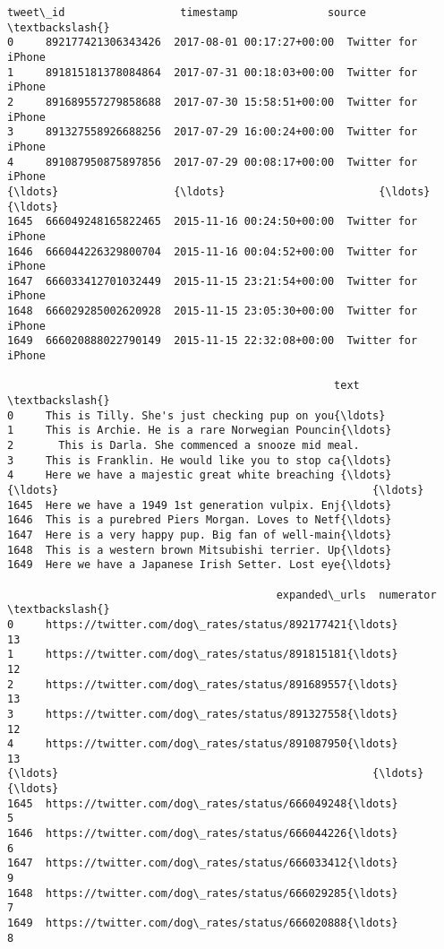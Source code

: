 \documentclass[11pt]{article}
\makeatletter
\newcommand{\boxspacing}{\kern\kvtcb@left@rule\kern\kvtcb@boxsep}
\newcommand{\prompt}[4]{
        {\ttfamily\llap{{\color{#2}[#3]:\hspace{3pt}#4}}\vspace{-\baselineskip}}
    }
\makeatother
\begin{document}
            \begin{tcolorbox}[breakable, size=fbox, boxrule=.5pt, pad at break*=1mm, opacityfill=0]
\prompt{Out}{outcolor}{76}{\boxspacing}
\begin{Verbatim}[commandchars=\\\{\}]
                tweet\_id                  timestamp              source  \textbackslash{}
0     892177421306343426  2017-08-01 00:17:27+00:00  Twitter for iPhone
1     891815181378084864  2017-07-31 00:18:03+00:00  Twitter for iPhone
2     891689557279858688  2017-07-30 15:58:51+00:00  Twitter for iPhone
3     891327558926688256  2017-07-29 16:00:24+00:00  Twitter for iPhone
4     891087950875897856  2017-07-29 00:08:17+00:00  Twitter for iPhone
{\ldots}                  {\ldots}                        {\ldots}                 {\ldots}
1645  666049248165822465  2015-11-16 00:24:50+00:00  Twitter for iPhone
1646  666044226329800704  2015-11-16 00:04:52+00:00  Twitter for iPhone
1647  666033412701032449  2015-11-15 23:21:54+00:00  Twitter for iPhone
1648  666029285002620928  2015-11-15 23:05:30+00:00  Twitter for iPhone
1649  666020888022790149  2015-11-15 22:32:08+00:00  Twitter for iPhone

                                                   text  \textbackslash{}
0     This is Tilly. She's just checking pup on you{\ldots}
1     This is Archie. He is a rare Norwegian Pouncin{\ldots}
2       This is Darla. She commenced a snooze mid meal.
3     This is Franklin. He would like you to stop ca{\ldots}
4     Here we have a majestic great white breaching {\ldots}
{\ldots}                                                 {\ldots}
1645  Here we have a 1949 1st generation vulpix. Enj{\ldots}
1646  This is a purebred Piers Morgan. Loves to Netf{\ldots}
1647  Here is a very happy pup. Big fan of well-main{\ldots}
1648  This is a western brown Mitsubishi terrier. Up{\ldots}
1649  Here we have a Japanese Irish Setter. Lost eye{\ldots}

                                          expanded\_urls  numerator  \textbackslash{}
0     https://twitter.com/dog\_rates/status/892177421{\ldots}         13
1     https://twitter.com/dog\_rates/status/891815181{\ldots}         12
2     https://twitter.com/dog\_rates/status/891689557{\ldots}         13
3     https://twitter.com/dog\_rates/status/891327558{\ldots}         12
4     https://twitter.com/dog\_rates/status/891087950{\ldots}         13
{\ldots}                                                 {\ldots}        {\ldots}
1645  https://twitter.com/dog\_rates/status/666049248{\ldots}          5
1646  https://twitter.com/dog\_rates/status/666044226{\ldots}          6
1647  https://twitter.com/dog\_rates/status/666033412{\ldots}          9
1648  https://twitter.com/dog\_rates/status/666029285{\ldots}          7
1649  https://twitter.com/dog\_rates/status/666020888{\ldots}          8


\end{Verbatim}
\end{tcolorbox}
\end{document}

